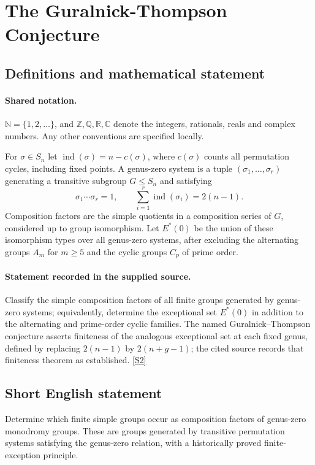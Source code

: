 \documentclass[11pt]{book}
\newcommand{\sref}[2]{\hyperlink{source:#1:#2}{[S#2]}}
\begin{document}
\section{The Guralnick-Thompson Conjecture}\label{statement}

\subsection{Definitions and mathematical statement}

\paragraph{Shared notation.}$\mathbb N=\{1,2,\ldots\}$, and $\mathbb Z,\mathbb Q,\mathbb R,\mathbb C$ denote the integers, rationals, reals and complex numbers. Any other conventions are specified locally.


For $\sigma\in S_n$ let $\operatorname{ind}(\sigma)=n-c(\sigma)$, where $c(\sigma)$ counts all permutation cycles, including fixed points. A genus-zero system is a tuple $(\sigma_1,\ldots,\sigma_r)$ generating a transitive subgroup $G\leq S_n$ and satisfying
\[\sigma_1\cdots\sigma_r=1,\qquad\sum_{i=1}^r\operatorname{ind}(\sigma_i)=2(n-1).\]
Composition factors are the simple quotients in a composition series of $G$, considered up to group isomorphism. Let $E^*(0)$ be the union of these isomorphism types over all genus-zero systems, after excluding the alternating groups $A_m$ for $m\geq5$ and the cyclic groups $C_p$ of prime order.
\paragraph{Statement recorded in the supplied source.}
Classify the simple composition factors of all finite groups generated by genus-zero systems; equivalently, determine the exceptional set $E^*(0)$ in addition to the alternating and prime-order cyclic families. The named Guralnick--Thompson conjecture asserts finiteness of the analogous exceptional set at each fixed genus, defined by replacing $2(n-1)$ by $2(n+g-1)$; the cited source records that finiteness theorem as established. \sref{statement}{2}
\subsection{Short English statement}
Determine which finite simple groups occur as composition factors of genus-zero monodromy groups. These are groups generated by transitive permutation systems satisfying the genus-zero relation, with a historically proved finite-exception principle.
\end{document}
